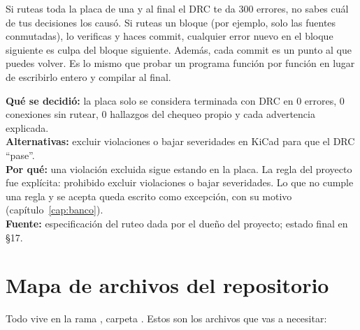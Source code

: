 \begin{idea}
Si ruteas toda la placa de una y al final el DRC te da 300 errores, no sabes cuál de tus decisiones los causó. Si ruteas un bloque (por ejemplo, solo las fuentes conmutadas), lo verificas y haces commit, cualquier error nuevo en el bloque siguiente es culpa del bloque siguiente. Además, cada commit es un punto al que puedes volver. Es lo mismo que probar un programa función por función en lugar de escribirlo entero y compilar al final.
\end{idea}

\begin{decision}
\textbf{Qué se decidió:} la placa solo se considera terminada con DRC en 0 errores, 0 conexiones sin rutear, 0 hallazgos del chequeo propio y cada advertencia explicada.\\
\textbf{Alternativas:} excluir violaciones o bajar severidades en KiCad para que el DRC ``pase''.\\
\textbf{Por qué:} una violación excluida sigue estando en la placa. La regla del proyecto fue explícita: prohibido excluir violaciones o bajar severidades. Lo que no cumple una regla y se acepta queda escrito como excepción, con su motivo (capítulo~\ref{cap:banco}).\\
\textbf{Fuente:} especificación del ruteo dada por el dueño del proyecto; estado final en  §17.
\end{decision}

\section{Mapa de archivos del repositorio}\label{sec:c01-archivos}

Todo vive en la rama , carpeta . Estos son los archivos que vas a necesitar:


